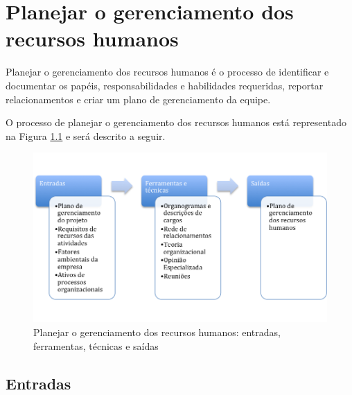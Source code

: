 \chapter{Planejar o gerenciamento dos recursos humanos}

Planejar o gerenciamento dos recursos humanos é o processo de identificar e documentar os papéis, responsabilidades e habilidades requeridas, reportar relacionamentos e criar um plano de gerenciamento da equipe.

O processo de planejar o gerenciamento dos recursos humanos está representado na Figura \ref{fig:rh:plan:efts} e será descrito a seguir.

\begin{figure}[!h]
	\centering
	\includegraphics[scale=0.5]{Figuras/rh_efts_planejar.png}
	\caption{Planejar o gerenciamento dos recursos humanos: entradas, ferramentas, técnicas e saídas}
	\label{fig:rh:plan:efts}
\end{figure}

\section{Entradas}

